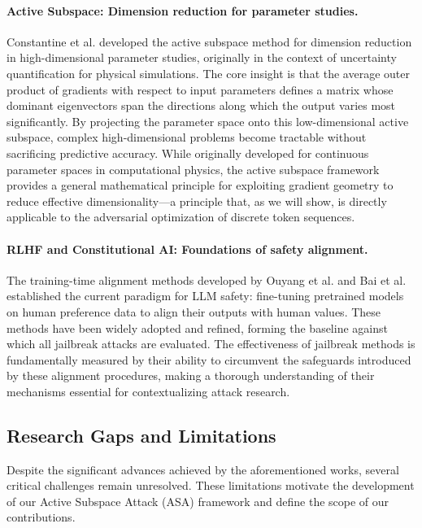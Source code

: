 ﻿\documentclass[lettersize,journal]{IEEEtran}
\begin{document}
\paragraph{Active Subspace: Dimension reduction for parameter studies.} Constantine et al. \cite{constantine2014active, constantine2015active} developed the active subspace method for dimension reduction in high-dimensional parameter studies, originally in the context of uncertainty quantification for physical simulations. The core insight is that the average outer product of gradients with respect to input parameters defines a matrix whose dominant eigenvectors span the directions along which the output varies most significantly. By projecting the parameter space onto this low-dimensional active subspace, complex high-dimensional problems become tractable without sacrificing predictive accuracy. While originally developed for continuous parameter spaces in computational physics, the active subspace framework provides a general mathematical principle for exploiting gradient geometry to reduce effective dimensionality---a principle that, as we will show, is directly applicable to the adversarial optimization of discrete token sequences.

\paragraph{RLHF and Constitutional AI: Foundations of safety alignment.} The training-time alignment methods developed by Ouyang et al. \cite{ouyang2022training} and Bai et al. \cite{bai2022constitutional} established the current paradigm for LLM safety: fine-tuning pretrained models on human preference data to align their outputs with human values. These methods have been widely adopted and refined, forming the baseline against which all jailbreak attacks are evaluated. The effectiveness of jailbreak methods is fundamentally measured by their ability to circumvent the safeguards introduced by these alignment procedures, making a thorough understanding of their mechanisms essential for contextualizing attack research.

\subsection{Research Gaps and Limitations}
\label{sec:gaps}

Despite the significant advances achieved by the aforementioned works, several critical challenges remain unresolved. These limitations motivate the development of our Active Subspace Attack (ASA) framework and define the scope of our contributions.
\end{document}
